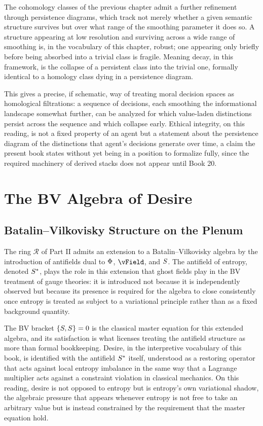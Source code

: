 The cohomology classes of the previous chapter admit a further refinement through persistence diagrams, which track not merely whether a given semantic structure survives but over what range of the smoothing parameter it does so. A structure appearing at low resolution and surviving across a wide range of smoothing is, in the vocabulary of this chapter, robust; one appearing only briefly before being absorbed into a trivial class is fragile. Meaning decay, in this framework, is the collapse of a persistent class into the trivial one, formally identical to a homology class dying in a persistence diagram.

This gives a precise, if schematic, way of treating moral decision spaces as homological filtrations: a sequence of decisions, each smoothing the informational landscape somewhat further, can be analyzed for which value-laden distinctions persist across the sequence and which collapse early. Ethical integrity, on this reading, is not a fixed property of an agent but a statement about the persistence diagram of the distinctions that agent's decisions generate over time, a claim the present book states without yet being in a position to formalize fully, since the required machinery of derived stacks does not appear until Book 20.

\part{The BV Algebra of Desire}

\chapter{Batalin--Vilkovisky Structure on the Plenum}

The ring $\mathcal{R}$ of Part II admits an extension to a Batalin--Vilkovisky algebra by the introduction of antifields dual to $\Phi$, $\vField$, and $S$. The antifield of entropy, denoted $S^{*}$, plays the role in this extension that ghost fields play in the BV treatment of gauge theories: it is introduced not because it is independently observed but because its presence is required for the algebra to close consistently once entropy is treated as subject to a variational principle rather than as a fixed background quantity.

The BV bracket $\{S, S\} = 0$ is the classical master equation for this extended algebra, and its satisfaction is what licenses treating the antifield structure as more than formal bookkeeping. Desire, in the interpretive vocabulary of this book, is identified with the antifield $S^{*}$ itself, understood as a restoring operator that acts against local entropy imbalance in the same way that a Lagrange multiplier acts against a constraint violation in classical mechanics. On this reading, desire is not opposed to entropy but is entropy's own variational shadow, the algebraic pressure that appears whenever entropy is not free to take an arbitrary value but is instead constrained by the requirement that the master equation hold.

